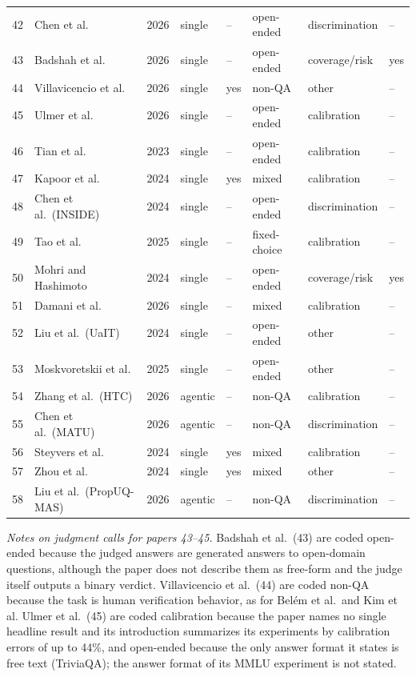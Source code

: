 \documentclass[acmsmall]{acmart}
\begin{document}
{\begin{longtable}{@{}r p{4.1cm} r l l l l l@{}}
42 & Chen et al. & 2026 & single & -- & open-ended & discrimination & -- \\
43 & Badshah et al. & 2026 & single & -- & open-ended & coverage/risk & yes \\
44 & Villavicencio et al. & 2026 & single & yes & non-QA & other & -- \\
45 & Ulmer et al. & 2026 & single & -- & open-ended & calibration & -- \\
46 & Tian et al. & 2023 & single & -- & open-ended & calibration & -- \\
47 & Kapoor et al. & 2024 & single & yes & mixed & calibration & -- \\
48 & Chen et al.\ (INSIDE) & 2024 & single & -- & open-ended & discrimination & -- \\
49 & Tao et al. & 2025 & single & -- & fixed-choice & calibration & -- \\
50 & Mohri and Hashimoto & 2024 & single & -- & open-ended & coverage/risk & yes \\
51 & Damani et al. & 2026 & single & -- & mixed & calibration & -- \\
52 & Liu et al.\ (UaIT) & 2024 & single & -- & open-ended & other & -- \\
53 & Moskvoretskii et al. & 2025 & single & -- & open-ended & other & -- \\
54 & Zhang et al.\ (HTC) & 2026 & agentic & -- & non-QA & calibration & -- \\
55 & Chen et al.\ (MATU) & 2026 & agentic & -- & non-QA & discrimination & -- \\
56 & Steyvers et al. & 2024 & single & yes & mixed & calibration & -- \\
57 & Zhou et al. & 2024 & single & yes & mixed & other & -- \\
58 & Liu et al.\ (PropUQ-MAS) & 2026 & agentic & -- & non-QA & discrimination & -- \\
\end{longtable}
}

\smallskip
\noindent\emph{Notes on judgment calls for papers 43--45.} Badshah et al.\ (43) are coded open-ended because the judged answers are generated answers to open-domain questions, although the paper does not describe them as free-form and the judge itself outputs a binary verdict. Villavicencio et al.\ (44) are coded non-QA because the task is human verification behavior, as for Bel\'em et al.\ and Kim et al. Ulmer et al.\ (45) are coded calibration because the paper names no single headline result and its introduction summarizes its experiments by calibration errors of up to 44\%, and open-ended because the only answer format it states is free text (TriviaQA); the answer format of its MMLU experiment is not stated.
\end{document}
